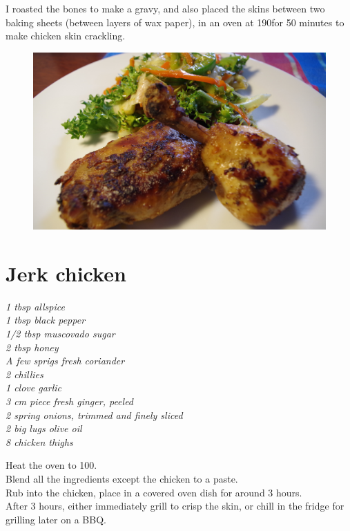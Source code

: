 \documentclass{tufte-book}
\begin{document}
I roasted the bones to make a gravy, and also placed the skins between two baking sheets (between layers of wax paper), in an oven at 190\celsius  for 50 minutes to make chicken skin crackling.


\newpage

\begin{figure}[h]
  \includegraphics[width=\linewidth]{jerkchicken.JPG}
\end{figure}

\section{Jerk chicken}

\smallskip
\emph{1 tbsp allspice
\\1 tbsp black pepper
\\1/2 tbsp muscovado sugar
\\2 tbsp honey
\\A few sprigs fresh coriander
\\2 chillies
\\1 clove garlic
\\3 cm piece fresh ginger, peeled
\\2 spring onions, trimmed and finely sliced
\\2 big lugs olive oil
\\8 chicken thighs}

\smallskip
Heat the oven to 100\celsius.
\\Blend all the ingredients except the chicken to a paste.
\\Rub into the chicken, place in a covered oven dish for around 3 hours.
\\After 3 hours, either immediately grill to crisp the skin, or chill in the fridge for grilling later on a BBQ.
\end{document}
